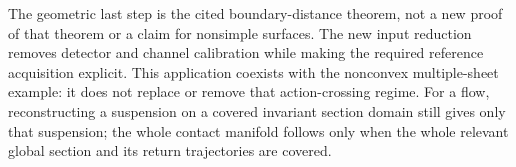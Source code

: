 The geometric last step is the cited boundary-distance theorem, not a
new proof of that theorem or a claim for nonsimple surfaces. The new
input reduction removes detector and channel calibration while making
the required reference acquisition explicit. This application coexists
with the nonconvex multiple-sheet example: it does not replace or
remove that action-crossing regime. For a flow, reconstructing a
suspension on a covered invariant section domain still gives only that
suspension; the whole contact manifold follows only when the whole
relevant global section and its return trajectories are covered.
